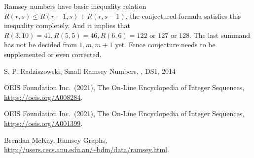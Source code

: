 \documentclass[12pt]{article}
\begin{document}
Ramsey numbers have basic inequality relation $R(r,s)\leq R(r-1,s)+R(r,s-1)$, 
the conjectured formula satisfies this inequality completely. And it implies that $R(3,10)=41, R(5,5)=46, R(6,6)=122 \text{ or } 127 \text{ or } 128$.
The last summand has not be decided from ${1,m,m+1}$ yet.   
Fence conjecture needs to be supplemented or even corrected.  



\begin{thebibliography}{99}

S. P. Radziszowski,
\newblock Small Ramsey Numbers,
, DS1, 2014

OEIS Foundation Inc.~(2021), The On-Line Encyclopedia of Integer Sequences, \url{https://oeis.org/A008284}.

OEIS Foundation Inc.~(2021), The On-Line Encyclopedia of Integer Sequences, \url{https://oeis.org/A001399}.

Brendan McKay,
\newblock Ramsey Graphs, \url{http://users.cecs.anu.edu.au/~bdm/data/ramsey.html}.

\end{thebibliography}
\end{document}
